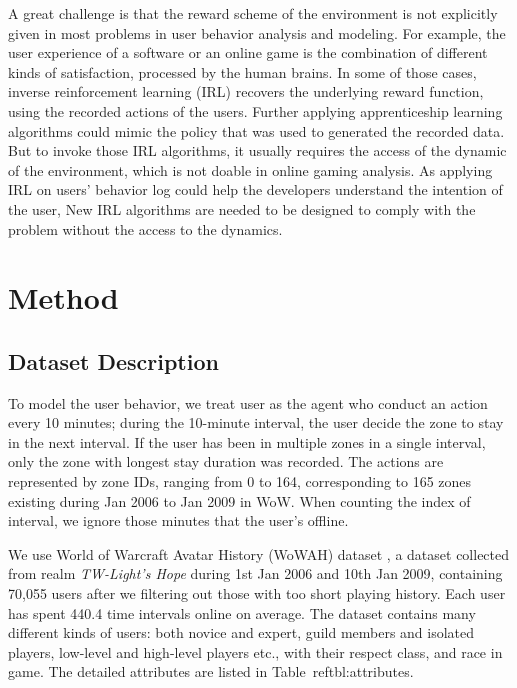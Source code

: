\documentclass{sigchi}
\begin{document}
A great challenge is that the reward scheme of the environment is not explicitly given in most problems in user behavior analysis and modeling. 
For example, the user experience of a software or an online game is the combination of different kinds of satisfaction, processed by the human brains.
In some of those cases, inverse reinforcement learning (IRL) \cite{ratliff2006maximum,ng2000algorithms} recovers the underlying reward function, using the recorded actions of the users.
Further applying apprenticeship learning algorithms \cite{abbeel2004apprenticeship} could mimic the policy that was used to generated the recorded data.
But to invoke those IRL algorithms, it usually requires the access of the dynamic of the environment, which is not doable in online gaming analysis. 
As applying IRL on users' behavior log could help the developers understand the intention of the user, New IRL algorithms are needed to be designed to comply with the problem without the access to the dynamics.

\section{Method}

\subsection{Dataset Description}

To model the user behavior, we treat user as the agent who conduct an action every 10 minutes; during the 10-minute interval, the user decide the zone to stay in the next interval. If the user has been in multiple zones in a single interval, only the zone with longest stay duration was recorded. The actions are represented by zone IDs, ranging from 0 to 164, corresponding to 165 zones existing during Jan 2006 to Jan 2009 in WoW. When counting the index of interval, we ignore those minutes that the user's offline.

We use World of Warcraft Avatar History (WoWAH) dataset \cite{lee2011world}, a dataset collected from realm \textit{TW-Light's Hope} during 1st Jan 2006 and 10th Jan 2009, containing 70,055 users after we filtering out those with too short playing history. Each user has spent 440.4 time intervals online on average. The dataset contains many different kinds of users: both novice and expert, guild members and isolated players, low-level and high-level players etc., with their respect class, and race in game. The detailed attributes are listed in Table~ref{tbl:attributes}.
\end{document}
